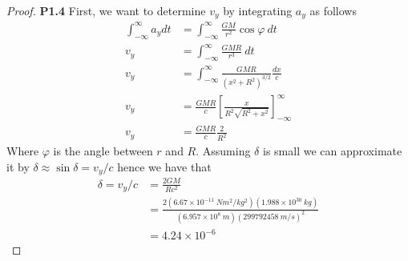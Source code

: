 \documentclass[11pt]{article}
\theoremstyle{definition}
\begin{document}
\cleardoublepage
\begin{proof}{\textbf{P1.4}}
    First, we want to determine $v_y$ by integrating $a_y$ as follows
    \begin{align*}
        \int_{-\infty}^{\infty} a_y dt &= \int_{-\infty}^{\infty}
        \frac{GM}{r^2} \cos \varphi~ dt\\
        v_y &= \int_{-\infty}^{\infty} \frac{GMR}{r^3}~ dt\\
        v_y &= \int_{-\infty}^{\infty} \frac{GMR}{(x^2 + R^2)^{3/2}}\frac{dx}{c}\\
        v_y &= \frac{GMR}{c}\left[\frac{x}{R^2\sqrt{R^2 + x^2}}\right]_{-\infty}^{\infty}\\
        v_y &= \frac{GMR}{c}\frac{2}{R^2}
    \end{align*}
    Where $\varphi$ is the angle between $r$ and $R$.
    Assuming $\delta$ is small we can approximate it by
    $\delta \approx \sin\delta = v_y/c$ hence we have that
    \begin{align*}
        \delta = v_y/c &= \frac{2GM}{Rc^2}\\
            &= \frac{2(6.67 \times 10^{-11}~Nm^2/kg^2)(1.988 \times 10^{30}~kg)}
            {(6.957 \times 10^8~m)(299792458~m/s)^2}\\
            &= 4.24 \times 10^{-6}
    \end{align*}
\end{proof}
\cleardoublepage
\end{document}
